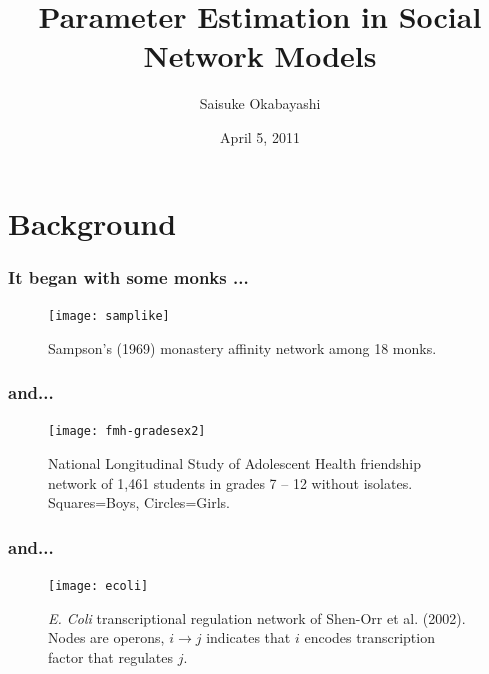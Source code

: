 \documentclass[slidestop,compress, 10pt]{beamer}
\title{Parameter Estimation in Social Network Models}
\author{
  Saisuke Okabayashi 
}
\institute{Department of Statistics \\ University of Minnesota}
\date{April 5, 2011}
\begin{document}

\frame{\titlepage}
\section{Background}


\frame
{
  \frametitle{It began with some monks ...}
\begin{figure}
\begin{center} 
\texttt{[image: samplike]}
\caption{Sampson's (1969) monastery affinity network among 18 monks.} 
\end{center} 
\end{figure}
}
%
\frame
{
  \frametitle{and... }
\begin{figure}
\begin{center} 
\texttt{[image: fmh-gradesex2]}
\caption{National Longitudinal Study of Adolescent Health friendship network of 1,461 students in grades 7 -- 12 without isolates.  Squares=Boys, Circles=Girls.} 
\end{center} 
\label{fmh} 
\end{figure}
}
\frame
{
  \frametitle{and...}

\begin{figure}
\begin{center} 
\texttt{[image: ecoli]}
\caption{\textit{E. Coli} transcriptional regulation network of Shen-Orr et al. (2002).  
Nodes are operons, $i \to j$ indicates that $i$ encodes transcription factor that regulates $j$.} 
\end{center} 
\end{figure}
}
\end{document}
